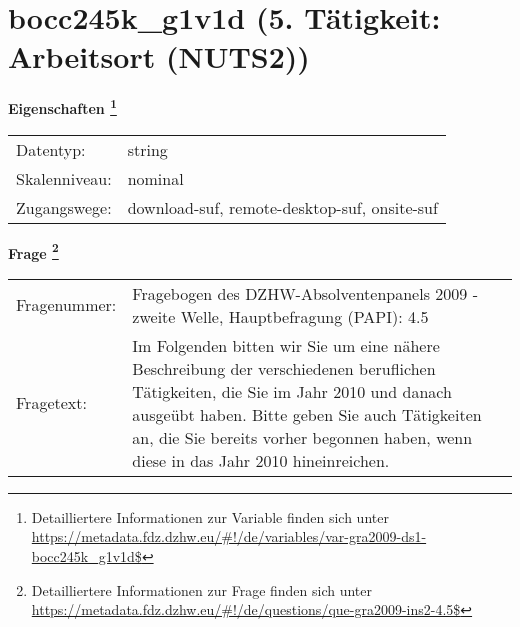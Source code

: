 
    \setcounter{footnote}{0}

    \vspace*{-1.8cm}
	\section{bocc245k\_g1v1d (5. Tätigkeit: Arbeitsort (NUTS2))}
	\label{section:bocc245k_g1v1d}



    \vspace*{0.5cm}
    \noindent\textbf{Eigenschaften
	\footnote{Detailliertere Informationen zur Variable finden sich unter
		\url{https://metadata.fdz.dzhw.eu/\#!/de/variables/var-gra2009-ds1-bocc245k_g1v1d$}}}\\
	\begin{tabularx}{\hsize}{@{}lX}
	Datentyp: & string \\
	Skalenniveau: & nominal \\
	Zugangswege: &
	  download-suf, 
	  remote-desktop-suf, 
	  onsite-suf
 \\
    \end{tabularx}



				\vspace*{0.5cm}
                \noindent\textbf{Frage
	                \footnote{Detailliertere Informationen zur Frage finden sich unter
		              \url{https://metadata.fdz.dzhw.eu/\#!/de/questions/que-gra2009-ins2-4.5$}}}\\
				\begin{tabularx}{\hsize}{@{}lX}
					Fragenummer: &
					  Fragebogen des DZHW-Absolventenpanels 2009 - zweite Welle, Hauptbefragung (PAPI):
					  4.5
 \\
					Fragetext: & Im Folgenden bitten wir Sie um eine nähere Beschreibung der verschiedenen beruflichen Tätigkeiten, die Sie im Jahr 2010 und danach ausgeübt haben. Bitte geben Sie auch Tätigkeiten an, die Sie bereits vorher begonnen haben, wenn diese in das Jahr 2010 hineinreichen. \\
				\end{tabularx}





